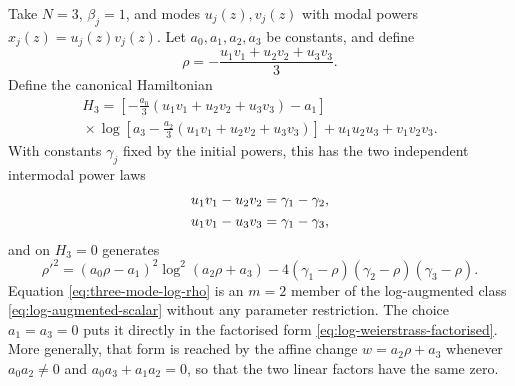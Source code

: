 \documentclass[11pt,a4paper]{article}
\numberwithin{equation}{section}
\begin{document}
Take $N=3$, $\beta_j=1$, and modes $u_j(z),v_j(z)$ with modal powers $x_j(z)=u_j(z)v_j(z)$. Let $a_0,a_1,a_2,a_3$ be constants, and define
\begin{equation}
    \rho
    =
    -\frac{u_1v_1+u_2v_2+u_3v_3}{3}.
\end{equation}
Define the canonical Hamiltonian
\begin{multline}
    H_3
    =
    \left[
        -\frac{a_0}{3}
        (u_1v_1+u_2v_2+u_3v_3)
        -a_1
    \right]
    \\
    {}\times
    \log\left[
        a_3
        -
        \frac{a_2}{3}
        (u_1v_1+u_2v_2+u_3v_3)
    \right]
    +
    u_1u_2u_3+v_1v_2v_3. \label{eq:three-mode-log-hamiltonian}
\end{multline}
With constants $\gamma_j$ fixed by the initial powers, this has the two independent intermodal power laws
\begin{align}
    u_1v_1-u_2v_2
    &=
    \gamma_1-\gamma_2,
    \notag \\
    u_1v_1-u_3v_3
    &=
    \gamma_1-\gamma_3,
\end{align}
and on $H_3=0$ generates
\begin{equation}
    \rho'^2
    =
    (a_0\rho-a_1)^2\log^2(a_2\rho+a_3)
    -
    4(\gamma_1-\rho)(\gamma_2-\rho)(\gamma_3-\rho).
    \label{eq:three-mode-log-rho}
\end{equation}
Equation \eqref{eq:three-mode-log-rho} is an $m=2$ member of the log-augmented class \eqref{eq:log-augmented-scalar} without any parameter restriction. The choice $a_1=a_3=0$ puts it directly in the factorised form \eqref{eq:log-weierstrass-factorised}. More generally, that form is reached by the affine change $w=a_2\rho+a_3$ whenever $a_0a_2\ne0$ and $a_0a_3+a_1a_2=0$, so that the two linear factors have the same zero.
\end{document}

